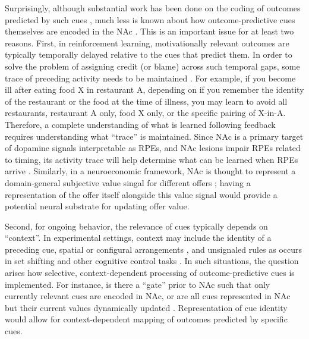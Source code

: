 \documentclass[11pt]{article}
\let\cite=\citep
\begin{document}
Surprisingly, although substantial work has been done on the coding of
outcomes predicted by such cues
\cite{Schultz1992,Hollerman1998,Hassani2001,Cromwell2003,Setlow2003,Nicola2004,Roitman2005,Day2006,Roesch2009a,Saddoris2011,Goldstein2012,Lansink2012,Bissonette2013,McGinty2013,Atallah2014,Sugam2014,Cooch2015,West2016},
much less is known about how outcome-predictive cues themselves are
encoded in the NAc \cite[but see;][]{Sleezer2016}. This is an
important issue for at least two reasons. First, in reinforcement
learning, motivationally relevant outcomes are typically temporally
delayed relative to the cues that predict them. In order to solve the
problem of assigning credit (or blame) across such temporal gaps, some
trace of preceding activity needs to be maintained
\cite{sutton1998,Lee2012}. For example, if you become ill after eating
food X in restaurant A, depending on if you remember the identity of
the restaurant or the food at the time of illness, you may learn to
avoid all restaurants, restaurant A only, food X only, or the specific
pairing of X-in-A. Therefore, a complete understanding of what is
learned following feedback requires understanding what “trace” is
maintained. Since NAc is a primary target of dopamine signals interpretable
as RPEs, and NAc lesions impair RPEs related to timing, its activity
trace will help determine what can be learned when RPEs arrive
\cite{Ikemoto2007,McDannald2011,Hart2014,Hamid2016,Takahashi2016}. Similarly,
in a neuroeconomic framework, NAc is thought to represent a
domain-general subjective value singal for different offers
\cite{Peters2009,Levy2012,Bartra2013,Sescousse2015}; having a representation of
the offer itself alongside this value signal would provide a potential neural substrate for updating offer
value.

Second, for ongoing behavior, the relevance of cues typically depends
on “context”. In experimental settings, context may include the
identity of a preceding cue, spatial or configural arrangements
\cite{Holland1992,Bouton1993,Honey2014}, and unsignaled rules as
occurs in set shifting and other cognitive control tasks
\cite{Grant1948,cohen1992context,Floresco2006a,Sleezer2016}. In such
situations, the question arises how selective, context-dependent
processing of outcome-predictive cues is implemented. For instance, is
there a “gate” prior to NAc such that only currently relevant cues are
encoded in NAc, or are all cues represented in NAc but their current
values dynamically updated
\cite{Goto2008,Fitzgerald2014,Sleezer2016}. Representation of cue
identity would allow for context-dependent mapping of outcomes
predicted by specific cues.
\end{document}
